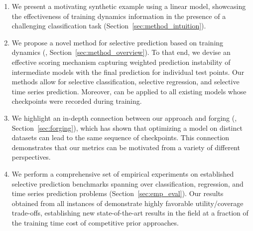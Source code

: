 \begin{enumerate}
    \item We present a motivating synthetic example using a linear model, showcasing the effectiveness of training dynamics information in the presence of a challenging classification task (Section~\ref{sec:method_intuition}). 
    \item We propose a novel method for selective prediction based on training dynamics (\sptd, Section~\ref{sec:method_overview}). To that end, we devise an effective scoring mechanism capturing weighted prediction instability of intermediate models with the final prediction for individual test points. Our methods allow for selective classification, selective regression, and selective time series prediction. Moreover, \sptd can be applied to all existing models whose checkpoints were recorded during training.
    \item We highlight an in-depth connection between our \sptd approach and forging (\cite{thudi2022necessity}, Section~\ref{sec:forging}), which has shown that optimizing a model on distinct datasets can lead to the same sequence of checkpoints. This connection demonstrates that our metrics can be motivated from a variety of different perspectives.
    \item We perform a comprehensive set of empirical experiments on established selective prediction benchmarks spanning over classification, regression, and time series prediction problems (Section~\ref{sec:emp_eval}). 
    Our results obtained from all instances of \sptd demonstrate highly favorable utility/coverage trade-offs, establishing new state-of-the-art results in the field at a fraction of the training time cost of competitive prior approaches. 
\end{enumerate}


